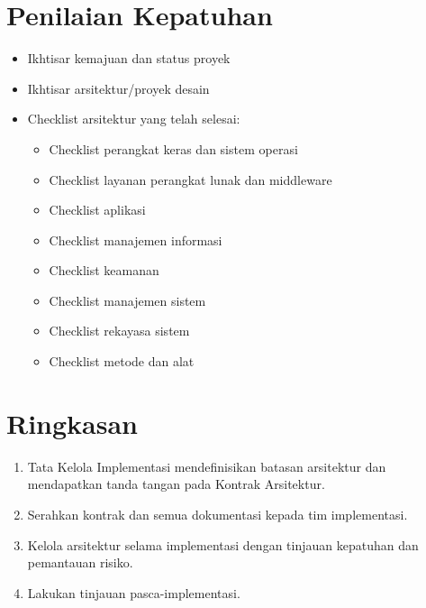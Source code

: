 \section{Penilaian Kepatuhan}
\begin{itemize}
	\item Ikhtisar kemajuan dan status proyek
	\item Ikhtisar arsitektur/proyek desain
	\item Checklist arsitektur yang telah selesai:
	\begin{itemize}
		\item Checklist perangkat keras dan sistem operasi
		\item Checklist layanan perangkat lunak dan middleware
		\item Checklist aplikasi
		\item Checklist manajemen informasi
		\item Checklist keamanan
		\item Checklist manajemen sistem
		\item Checklist rekayasa sistem
		\item Checklist metode dan alat
	\end{itemize}
\end{itemize}

\section{Ringkasan}
\begin{enumerate}
	\item Tata Kelola Implementasi mendefinisikan batasan arsitektur dan mendapatkan tanda tangan pada Kontrak Arsitektur.
	\item Serahkan kontrak dan semua dokumentasi kepada tim implementasi.
	\item Kelola arsitektur selama implementasi dengan tinjauan kepatuhan dan pemantauan risiko.
	\item Lakukan tinjauan pasca-implementasi.
\end{enumerate}
